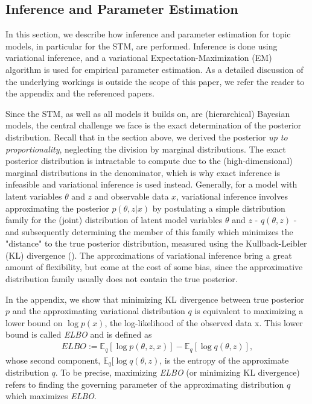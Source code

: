 \documentclass[12pt]{article}
\begin{document}
\subsection{Inference and Parameter Estimation}

In this section, we describe how inference and parameter estimation for topic models, in particular for the STM, are performed. Inference is done using variational inference, and a variational Expectation-Maximization (EM) algorithm is used for empirical parameter estimation. As a detailed discussion of the underlying workings is outside the scope of this paper, we refer the reader to the appendix and the referenced papers.

Since the STM, as well as all models it builds on, are (hierarchical) Bayesian models, the central challenge we face is the exact determination of the posterior distribution. Recall that in the section above, we derived the posterior \textit{up to proportionality}, neglecting the division by marginal distributions. The exact posterior distribution is intractable to compute due to the (high-dimensional) marginal distributions in the denominator, which is why exact inference is infeasible and variational inference is used instead. Generally, for a model with latent variables $\theta$ and $z$ and observable data $x$, variational inference involves approximating the posterior $p(\theta,z|x)$ by postulating a simple distribution family for the (joint) distribution of latent model variables $\theta$ and $z$ - $q(\theta,z)$ - and subsequently determining the member of this family which minimizes the "distance" to the true posterior distribution, measured using the Kullback-Leibler (KL) divergence (\citealp{wang2013variational}). The approximations of variational inference bring a great amount of flexibility, but come at the cost of some bias, since the approximative distribution family usually does not contain the true posterior.

In the appendix, we show that minimizing KL divergence between true posterior $p$ and the approximating variational distribution $q$ is equivalent to maximizing a lower bound on $\log p(x)$, the log-likelihood of the observed data x. This lower bound is called \textit{ELBO} and is defined as
\begin{align*}
ELBO := \mathbb{E}_q[\log p(\theta,z,x)] - \mathbb{E}_q[\log q(\theta,z)],
\end{align*}
whose second component, $\mathbb{E}_q[\log q(\theta,z)$, is the entropy of the approximate distribution $q$. To be precise, maximizing \textit{ELBO} (or minimizing KL divergence) refers to finding the governing parameter of the approximating distribution $q$ which maximizes \textit{ELBO}.
\end{document}
